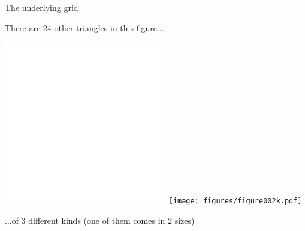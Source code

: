 \documentclass[14pt]{beamer}
\begin{document}

    \begin{frame}{The underlying grid}
        \begin{center}
            There are 24 other triangles in this figure...

            \bigskip \bigskip

            \includegraphics[height=18ex]{figures/figure002b.pdf}\qquad
            \texttt{[image: figures/figure002k.pdf]}\\[-0.1ex]

            \bigskip \bigskip

            ...of 3 different kinds (one of them comes in 2 sizes)
        \end{center}
    \end{frame}

\end{document}
